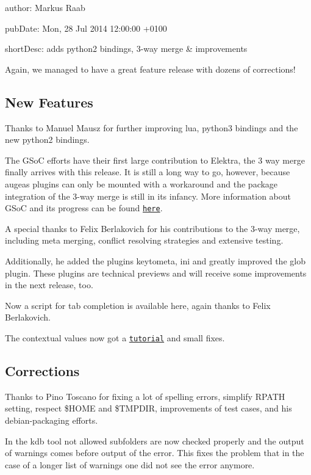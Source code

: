 
\begin{DoxyItemize}
\item author\+: Markus Raab
\item pub\+Date\+: Mon, 28 Jul 2014 12\+:00\+:00 +0100
\item short\+Desc\+: adds python2 bindings, 3-\/way merge \& improvements
\end{DoxyItemize}

Again, we managed to have a great feature release with dozens of corrections!

\subsection*{New Features}

Thanks to Manuel Mausz for further improving lua, python3 bindings and the new python2 bindings.

The G\+SoC efforts have their first large contribution to Elektra, the 3 way merge finally arrives with this release. It is still a long way to go, however, because augeas plugins can only be mounted with a workaround and the package integration of the 3-\/way merge is still in its infancy. More information about G\+SoC and its progress can be found \href{http://community.libelektra.org/wp}{\tt here}.

A special thanks to Felix Berlakovich for his contributions to the 3-\/way merge, including meta merging, conflict resolving strategies and extensive testing.

Additionally, he added the plugins keytometa, ini and greatly improved the glob plugin. These plugins are technical previews and will receive some improvements in the next release, too.

Now a script for tab completion is available here, again thanks to Felix Berlakovich.

The contextual values now got a \href{https://github.com/ElektraInitiative/libelektra/tree/master/src/tools/gen}{\tt tutorial} and small fixes.

\subsection*{Corrections}

Thanks to Pino Toscano for fixing a lot of spelling errors, simplify R\+P\+A\+TH setting, respect \$\+H\+O\+ME and \$\+T\+M\+P\+D\+IR, improvements of test cases, and his debian-\/packaging efforts.

In the kdb tool not allowed subfolders are now checked properly and the output of warnings comes before output of the error. This fixes the problem that in the case of a longer list of warnings one did not see the error anymore.

